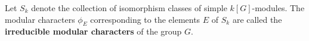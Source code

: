 Let $S_k$ denote the collection of isomorphism classes of simple $k[G]$-modules. The modular characters $\phi_E$ corresponding to the elements $E$ of $S_k$ are called the \textbf{irreducible modular characters} of the group $G$.
